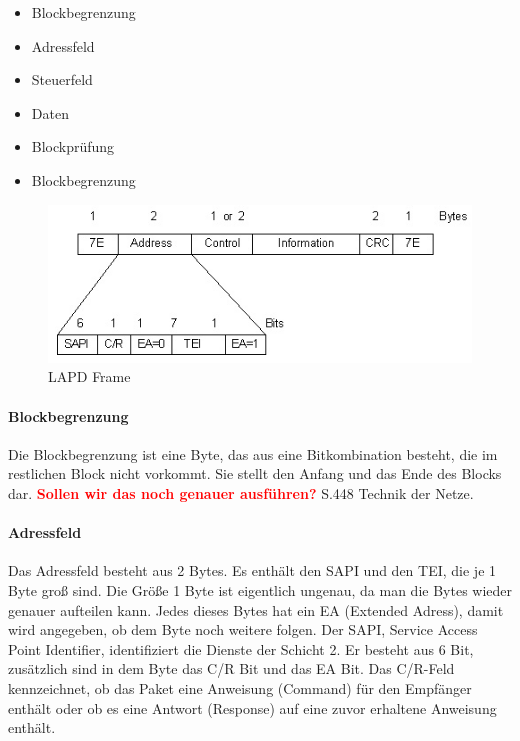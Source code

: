 \documentclass[12pt, a4paper, ngerman]{article}
\begin{document}
\begin{itemize}
	\item Blockbegrenzung
	\item Adressfeld
	\item Steuerfeld
	\item Daten
	\item Blockprüfung
	\item Blockbegrenzung
\end{itemize}

\begin{figure}[H]
	\centering
	\includegraphics[width=0.9\linewidth]{Grafiken/lapd_frame.jpg}
	\caption{LAPD Frame \cite{lapd_rahmen}}
	\label{lapd_frame}
\end{figure}

\paragraph{Blockbegrenzung \label{blockbegrenzung}}
Die Blockbegrenzung ist eine Byte, das aus eine Bitkombination besteht, die im restlichen Block nicht vorkommt. Sie stellt den Anfang und das Ende des Blocks dar. \textcolor{red}{\textbf{Sollen wir das noch genauer ausführen?}}  S.448 Technik der Netze.  

\paragraph{Adressfeld}
Das Adressfeld besteht aus 2 Bytes. Es enthält den SAPI und den TEI, die je 1 Byte groß sind. Die Größe 1 Byte ist eigentlich ungenau, da man die Bytes wieder genauer aufteilen kann. Jedes dieses Bytes hat ein EA (Extended Adress), damit wird angegeben, ob dem Byte noch weitere folgen. Der SAPI, Service Access Point Identifier,  identifiziert die Dienste der Schicht 2. Er besteht aus 6 Bit, zusätzlich sind in dem Byte das C/R Bit und das EA Bit. Das C/R-Feld kennzeichnet, ob das Paket eine Anweisung (Command) für den Empfänger enthält oder ob es eine Antwort (Response) auf eine zuvor erhaltene Anweisung enthält. 
\end{document}
